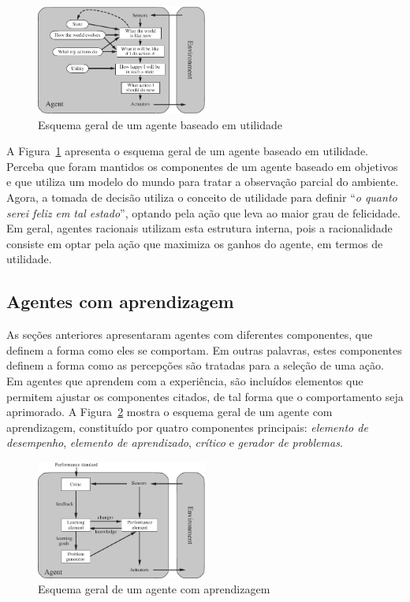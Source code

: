 \begin{figure}[h]
	\centering
	\includegraphics[width=0.5\textwidth]{img/agente-baseado-utilidade}
	\caption{Esquema geral de um agente baseado em utilidade}
	\label{fig:agente-baseado-utilidade}
\end{figure}

A Figura~\ref{fig:agente-baseado-utilidade} apresenta o esquema geral de um agente baseado em utilidade. Perceba que foram mantidos os componentes de um agente baseado em objetivos e que utiliza um modelo do mundo para tratar a observação parcial do ambiente. Agora, a tomada de decisão utiliza o conceito de utilidade para definir ``\textit{o quanto serei feliz em tal estado}'', optando pela ação que leva ao maior grau de felicidade. Em geral, agentes racionais utilizam esta estrutura interna, pois a racionalidade consiste em optar pela ação que maximiza os ganhos do agente, em termos de utilidade.

\subsection{Agentes com aprendizagem}

As seções anteriores apresentaram agentes com diferentes componentes, que definem a forma como eles se comportam. Em outras palavras, estes componentes definem a forma como as percepções são tratadas para a seleção de uma ação. Em agentes que aprendem com a experiência, são incluídos elementos que permitem ajustar os componentes citados, de tal forma que o comportamento seja aprimorado. A Figura~\ref{fig:agente-aprendizagem} mostra o esquema geral de um agente com aprendizagem, constituído por quatro componentes principais: \textit{elemento de desempenho}, \textit{elemento de aprendizado}, \textit{crítico} e \textit{gerador de problemas}.

\begin{figure}[h]
	\centering
	\includegraphics[width=0.5\textwidth]{img/agente-aprendizagem}
	\caption{Esquema geral de um agente com aprendizagem}
	\label{fig:agente-aprendizagem}
\end{figure}

